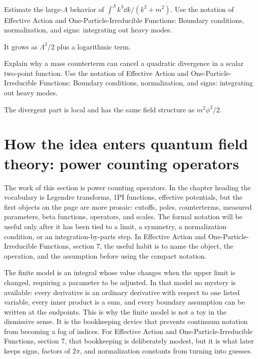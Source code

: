 \begin{exercise}
Estimate the large-\(\Lambda\) behavior of \(\int^\Lambda k^3\dd k/(k^2+m^2)\).  Use the notation of Effective Action and One-Particle-Irreducible Functions: Boundary conditions, normalization, and signs: integrating out heavy modes.
\begin{answer}
It grows as \(\Lambda^2/2\) plus a logarithmic term.
\end{answer}
\end{exercise}

\begin{exercise}
Explain why a mass counterterm can cancel a quadratic divergence in a scalar two-point function.  Use the notation of Effective Action and One-Particle-Irreducible Functions: Boundary conditions, normalization, and signs: integrating out heavy modes.
\begin{answer}
The divergent part is local and has the same field structure as \(m^2\phi^2/2\).
\end{answer}
\end{exercise}



\section{How the idea enters quantum field theory: power counting operators}

The work of this section is power counting operators.  In the chapter heading the vocabulary is Legendre transforms, 1PI functions, effective potentials, but the first objects on the page are more prosaic: cutoffs, poles, counterterms, measured parameters, beta functions, operators, and scales.  The formal notation will be useful only after it has been tied to a limit, a symmetry, a normalization condition, or an integration-by-parts step.  In Effective Action and One-Particle-Irreducible Functions, section 7, the useful habit is to name the object, the operation, and the assumption before using the compact notation.

The finite model is an integral whose value changes when the upper limit is changed, requiring a parameter to be adjusted.  In that model no mystery is available: every derivative is an ordinary derivative with respect to one listed variable, every inner product is a sum, and every boundary assumption can be written at the endpoints.  This is why the finite model is not a toy in the dismissive sense.  It is the bookkeeping device that prevents continuum notation from becoming a fog of indices.  For Effective Action and One-Particle-Irreducible Functions, section 7, that bookkeeping is deliberately modest, but it is what later keeps signs, factors of \(2\pi\), and normalization constants from turning into guesses.

